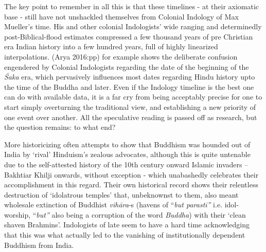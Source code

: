 The key point to remember in all this is that these timelines - at their axiomatic base - still have not unshackled themselves from Colonial Indology of Max Mueller’s time. His and other colonial Indologists’ wide ranging and determinedly post-Biblical-flood estimates compressed a few thousand years of pre Christian era Indian history into a few hundred years, full of highly linearized interpolations. (Arya 2016:pp) for example shows the deliberate confusion engendered by Colonial Indologists regarding the date of the beginning of the \textit{Śaka} era, which pervasively influences most dates regarding Hindu history upto the time of the Buddha and later. Even if the Indology timeline is the best one can do with available data, it is a far cry from being acceptably precise for one to start simply overturning the traditional view, and establishing a new priority of one event over another. All the speculative reading is passed off as research, but the question remains: to what end?

More historicizing often attempts to show that Buddhism was hounded out of India by ‘rival’ Hinduism’s zealous advocates, although this is quite untenable due to the self-attested history of the 10th century onward Islamic invaders – Bakhtiar Khilji onwards, without exception - which unabashedly celebrates their accomplishment in this regard. Their own historical record shows their relentless destruction of ‘idolatrous temples’ that, unbeknownst to them, also meant wholesale extinction of Buddhist \textit{vihāra}-s (havens of “\textit{but parastī”} i.e. idol-worship, “\textit{but”} also being a corruption of the word \textit{Buddha}) with their ‘clean shaven Brahmins’. Indologists of late seem to have a hard time acknowledging that this was what actually led to the vanishing of institutionally dependent Buddhism from India.

